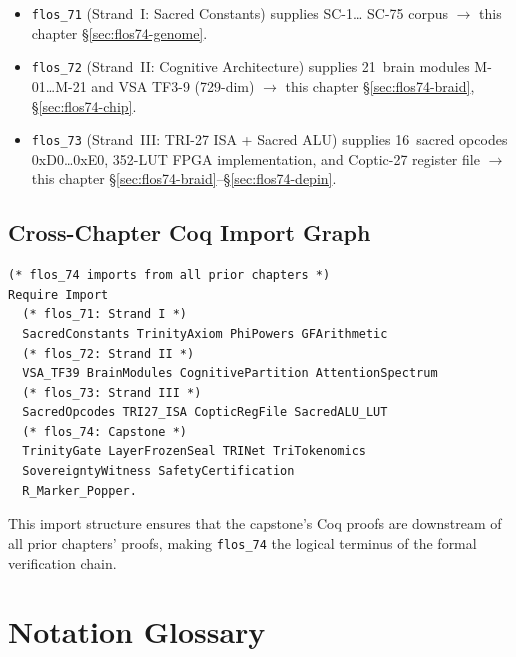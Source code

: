 \begin{itemize}
  \item \texttt{flos\_71} (Strand~I: Sacred Constants) supplies SC-1\ldots
        SC-75 corpus $\to$ this chapter \S\ref{sec:flos74-genome}.
  \item \texttt{flos\_72} (Strand~II: Cognitive Architecture) supplies
        21~brain modules M-01\ldots M-21 and VSA TF3-9 (729-dim)
        $\to$ this chapter \S\ref{sec:flos74-braid}, \S\ref{sec:flos74-chip}.
  \item \texttt{flos\_73} (Strand~III: TRI-27 ISA + Sacred ALU) supplies
        16~sacred opcodes 0xD0\ldots0xE0, 352-LUT FPGA implementation, and
        Coptic-27 register file
        $\to$ this chapter \S\ref{sec:flos74-braid}--\S\ref{sec:flos74-depin}.
\end{itemize}

\subsection{Cross-Chapter Coq Import Graph}

\begin{verbatim}
(* flos_74 imports from all prior chapters *)
Require Import
  (* flos_71: Strand I *)
  SacredConstants TrinityAxiom PhiPowers GFArithmetic
  (* flos_72: Strand II *)
  VSA_TF39 BrainModules CognitivePartition AttentionSpectrum
  (* flos_73: Strand III *)
  SacredOpcodes TRI27_ISA CopticRegFile SacredALU_LUT
  (* flos_74: Capstone *)
  TrinityGate LayerFrozenSeal TRINet TriTokenomics
  SovereigntyWitness SafetyCertification
  R_Marker_Popper.
\end{verbatim}

This import structure ensures that the capstone's Coq proofs are downstream of
all prior chapters' proofs, making \texttt{flos\_74} the logical terminus of
the formal verification chain.


\section{Notation Glossary}
\label{sec:flos74-notation}

